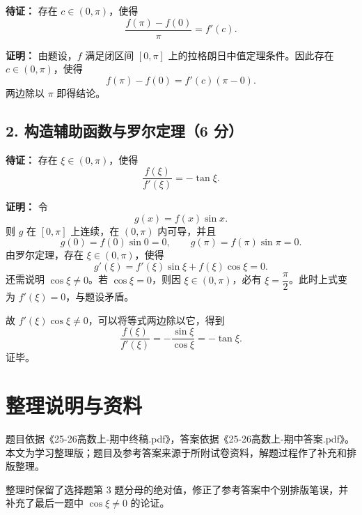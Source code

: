 \documentclass[UTF8,a4paper,11pt,fontset=fandol]{ctexart}
\begin{document}
\textbf{待证：} 存在 $c\in(0,\pi)$，使得
\[
\frac{f(\pi)-f(0)}\pi=f'(c).
\]

\textbf{证明：} 由题设，$f$ 满足闭区间 $[0,\pi]$ 上的拉格朗日中值定理条件。因此存在 $c\in(0,\pi)$，使得
\[
f(\pi)-f(0)=f'(c)(\pi-0).
\]
两边除以 $\pi$ 即得结论。

\subsection*{2. 构造辅助函数与罗尔定理（6 分）}

\textbf{待证：} 存在 $\xi\in(0,\pi)$，使得
\[
\frac{f(\xi)}{f'(\xi)}=-\tan\xi.
\]

\textbf{证明：} 令
\[
g(x)=f(x)\sin x.
\]
则 $g$ 在 $[0,\pi]$ 上连续，在 $(0,\pi)$ 内可导，并且
\[
g(0)=f(0)\sin0=0,\qquad g(\pi)=f(\pi)\sin\pi=0.
\]
由罗尔定理，存在 $\xi\in(0,\pi)$，使得
\[
g'(\xi)=f'(\xi)\sin\xi+f(\xi)\cos\xi=0.
\]
还需说明 $\cos\xi\ne0$。若 $\cos\xi=0$，则因 $\xi\in(0,\pi)$，必有 $\xi=\dfrac\pi2$。此时上式变为 $f'(\xi)=0$，与题设矛盾。

故 $f'(\xi)\cos\xi\ne0$，可以将等式两边除以它，得到
\[
\boxed{\frac{f(\xi)}{f'(\xi)}=-\frac{\sin\xi}{\cos\xi}=-\tan\xi}.
\]
证毕。

\section*{整理说明与资料}

题目依据《25-26高数上-期中终稿.pdf》，答案依据《25-26高数上-期中答案.pdf》。本文为学习整理版；题目及参考答案来源于所附试卷资料，解题过程作了补充和排版整理。

整理时保留了选择题第 3 题分母的绝对值，修正了参考答案中个别排版笔误，并补充了最后一题中 $\cos\xi\ne0$ 的论证。
\end{document}
